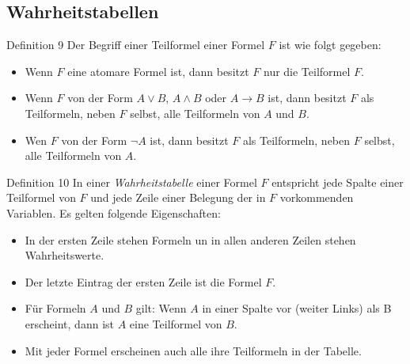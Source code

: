 \subsection{Wahrheitstabellen}
	\begin{definition}{Definition 9}
		Der Begriff einer Teilformel einer Formel $F$ ist wie folgt gegeben: \\
		\begin{itemize}
			\item Wenn $F$ eine atomare Formel ist, dann besitzt $F$ nur die Teilformel $F$.
			\item Wenn $F$ von der Form $A \lor B$, $A \land B$ oder $A \rightarrow B$ ist,
				dann besitzt $F$ als Teilformeln, neben $F$ selbst, alle Teilformeln von
				$A$ und $B$.
			\item Wen $F$ von der Form $\neg A$ ist, dann besitzt $F$ als Teilformeln, neben
				$F$ selbst, alle Teilformeln von $A$.
		\end{itemize}
	\end{definition}
	\begin{definition}{Definition 10}
		In einer \textit{Wahrheitstabelle} einer Formel $F$ entspricht jede Spalte einer Teilformel
		von $F$ und jede Zeile einer Belegung der in $F$ vorkommenden Variablen. Es gelten folgende
		Eigenschaften:
		\begin{itemize}
			\item In der ersten Zeile stehen Formeln un in allen anderen Zeilen stehen
				Wahrheitswerte.
			\item Der letzte Eintrag der ersten Zeile ist die Formel $F$.
			\item Für Formeln $A$ und $B$ gilt: Wenn $A$ in einer Spalte vor (weiter Links) als B
				erscheint, dann ist $A$ eine Teilformel von $B$.
			\item Mit jeder Formel erscheinen auch alle ihre Teilformeln in der Tabelle.
		\end{itemize}
	\end{definition}

